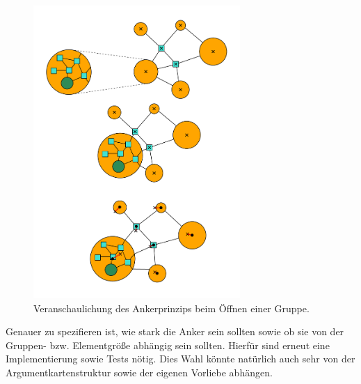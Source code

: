 \begin{figure}[h!]
\begin{center} 
  \includegraphics[width=0.7\textwidth]{Pics/Interaktion.pdf}
  \caption{Veranschaulichung des Ankerprinzips beim Öffnen einer Gruppe.}
  \label{f:Interaktion}
\end{center}
\end{figure}


Genauer zu spezifieren ist, wie stark die Anker sein sollten sowie ob sie von der Gruppen- bzw. Elementgröße abhängig sein sollten. 
Hierfür sind erneut eine Implementierung sowie Tests nötig. Dies Wahl könnte natürlich auch sehr von der Argumentkartenstruktur sowie der eigenen Vorliebe abhängen.

